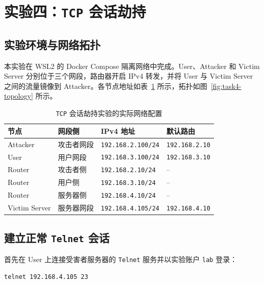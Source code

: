 \section{实验四：\texttt{TCP} 会话劫持}

\subsection{实验环境与网络拓扑}

本实验在 WSL2 的 Docker Compose 隔离网络中完成。User、Attacker 和 Victim Server 分别位于三个网段，路由器开启 IPv4 转发，并将 User 与 Victim Server 之间的流量镜像到 Attacker。各节点地址如表~\ref{tab:task4-network} 所示，拓扑如图~\ref{fig:task4-topology} 所示。

\begin{table}[H]
    \centering
    \caption{\texttt{TCP} 会话劫持实验的实际网络配置}
    \label{tab:task4-network}
    \renewcommand{\arraystretch}{1.2}
    \begin{tabularx}{\linewidth}{l l l X}
        \toprule
        节点 & 网段侧 & IPv4 地址 & 默认路由 \\
        \midrule
        Attacker & 攻击者网段 & \texttt{192.168.2.100/24} & \texttt{192.168.2.10} \\
        User & 用户网段 & \texttt{192.168.3.100/24} & \texttt{192.168.3.10} \\
        Router & 攻击者侧 & \texttt{192.168.2.10/24} & -- \\
        Router & 用户侧 & \texttt{192.168.3.10/24} & -- \\
        Router & 服务器侧 & \texttt{192.168.4.10/24} & -- \\
        Victim Server & 服务器网段 & \texttt{192.168.4.105/24} & \texttt{192.168.4.10} \\
        \bottomrule
    \end{tabularx}
\end{table}


\subsection{建立正常 \texttt{Telnet} 会话}

首先在 User 上连接受害者服务器的 \texttt{Telnet} 服务并以实验账户 \texttt{lab} 登录：

\begin{lstlisting}[language=bash,caption={User 登录 Victim Server 的 \texttt{Telnet} 服务}]
telnet 192.168.4.105 23
\end{lstlisting}

